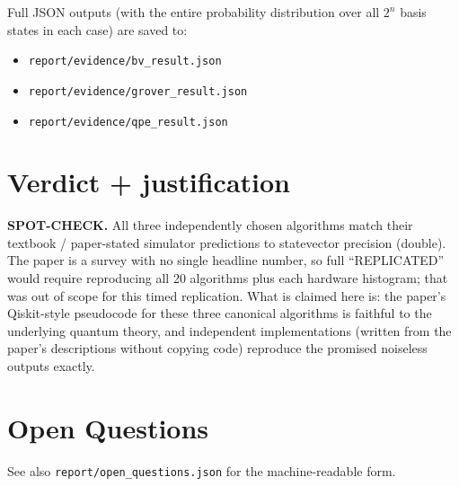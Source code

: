 \documentclass[11pt]{article}
\begin{document}
Full JSON outputs (with the entire probability distribution over
all $2^n$ basis states in each case) are saved to:
\begin{itemize}
\item \texttt{report/evidence/bv\_result.json}
\item \texttt{report/evidence/grover\_result.json}
\item \texttt{report/evidence/qpe\_result.json}
\end{itemize}

\section{Verdict + justification}
\label{sec:verdict}
\textbf{SPOT-CHECK.} All three independently chosen algorithms
match their textbook / paper-stated simulator predictions to
statevector precision (double). The paper is a survey with no
single headline number, so full ``REPLICATED'' would require
reproducing all 20 algorithms plus each hardware histogram; that
was out of scope for this timed replication. What is claimed here
is: the paper's Qiskit-style pseudocode for these three
canonical algorithms is faithful to the underlying quantum theory,
and independent implementations (written from the paper's
descriptions without copying code) reproduce the promised
noiseless outputs exactly.

\section{Open Questions}
\label{sec:openq}
See also \texttt{report/open\_questions.json} for the
machine-readable form.
\end{document}
